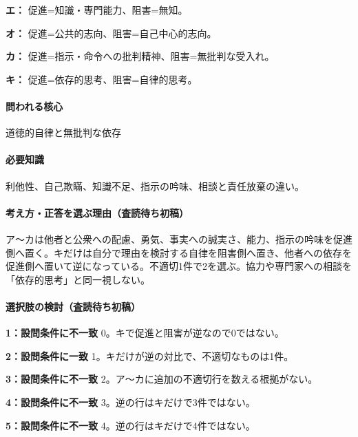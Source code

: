 \noindent\textbf{エ：} 促進=知識・専門能力、阻害=無知。\par

\noindent\textbf{オ：} 促進=公共的志向、阻害=自己中心的志向。\par

\noindent\textbf{カ：} 促進=指示・命令への批判精神、阻害=無批判な受入れ。\par

\noindent\textbf{キ：} 促進=依存的思考、阻害=自律的思考。\par

\paragraph{問われる核心} 道徳的自律と無批判な依存

\paragraph{必要知識} 利他性、自己欺瞞、知識不足、指示の吟味、相談と責任放棄の違い。

\paragraph{考え方・正答を選ぶ理由（査読待ち初稿）} ア〜カは他者と公衆への配慮、勇気、事実への誠実さ、能力、指示の吟味を促進側へ置く。キだけは自分で理由を検討する自律を阻害側へ置き、他者への依存を促進側へ置いて逆になっている。不適切1件で2を選ぶ。協力や専門家への相談を「依存的思考」と同一視しない。

\paragraph{選択肢の検討（査読待ち初稿）}\mbox{}\par

\noindent\textbf{1：設問条件に不一致} 0。キで促進と阻害が逆なので0ではない。\par

\noindent\textbf{2：設問条件に一致} 1。キだけが逆の対比で、不適切なものは1件。\par

\noindent\textbf{3：設問条件に不一致} 2。ア〜カに追加の不適切行を数える根拠がない。\par

\noindent\textbf{4：設問条件に不一致} 3。逆の行はキだけで3件ではない。\par

\noindent\textbf{5：設問条件に不一致} 4。逆の行はキだけで4件ではない。\par


